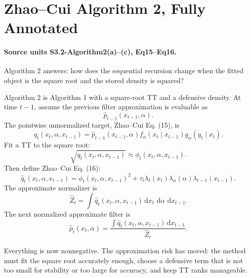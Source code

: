 \documentclass[11pt]{article}
\newcommand{\dd}{\,\mathrm d}
\begin{document}
\begin{center}
\end{center}

\section{Zhao--Cui Algorithm 2, Fully Annotated}

\paragraph{Source units S3.2-Algorithm2(a)--(c), Eq15--Eq16.}
Algorithm 2 answers: how does the sequential recursion change when the fitted
object is the square root and the stored density is squared?

Algorithm 2 is Algorithm 1 with a square-root TT and a defensive density.
At time \(t-1\), assume the previous filter approximation is evaluable as
\[
    \widehat p_{t-1}(x_{t-1},\alpha).
\]
The pointwise unnormalized target, Zhao--Cui Eq. (15), is
\[
    q_t(x_t,\alpha,x_{t-1})
    =
    \widehat p_{t-1}(x_{t-1},\alpha)
    f_\alpha(x_t\mid x_{t-1})
    g_\alpha(y_t\mid x_t).
    \tag{A2-1}
\]
Fit a TT to the square root:
\[
    \sqrt{q_t(x_t,\alpha,x_{t-1})}
    \approx
    \phi_t(x_t,\alpha,x_{t-1}).
    \tag{A2-2}
\]
Then define Zhao--Cui Eq. (16):
\[
    \widehat q_t(x_t,\alpha,x_{t-1})
    =
    \phi_t(x_t,\alpha,x_{t-1})^2
    +
    \tau_t\lambda_t(x_t)\lambda_\alpha(\alpha)\lambda_{t-1}(x_{t-1}).
    \tag{A2-3}
\]
The approximate normalizer is
\[
    \widehat Z_t
    =
    \int \widehat q_t(x_t,\alpha,x_{t-1})
    \dd x_t\,\dd\alpha\,\dd x_{t-1}.
    \tag{A2-4}
\]
The next normalized approximate filter is
\[
    \widehat p_t(x_t,\alpha)
    =
    \frac{\int \widehat q_t(x_t,\alpha,x_{t-1})\dd x_{t-1}}
    {\widehat Z_t}.
    \tag{A2-5}
\]

Everything is now nonnegative.  The approximation risk has moved: the method
must fit the square root accurately enough, choose a defensive term that is not
too small for stability or too large for accuracy, and keep TT ranks manageable.
\end{document}
